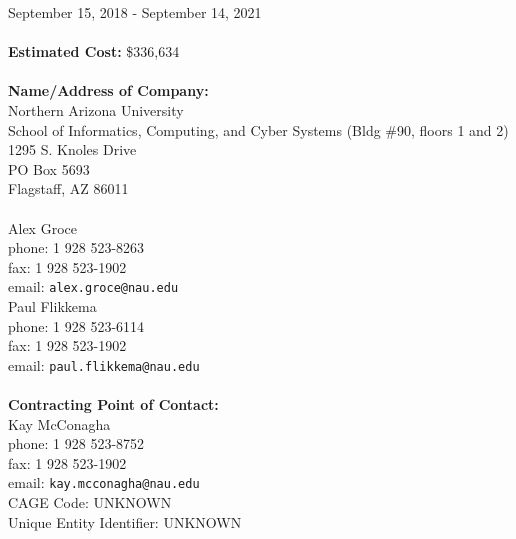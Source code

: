 \documentclass[12pt]{article}
\newcommand{\mycomment}[1]{}
\begin{document}
\mycomment{
\numberofauthors{1}
\author{
\alignauthor
Arpit Christi, Matthew Lyle Olson, Mohammad Amin Alipour, Alex Groce\\
\affaddr{School of Electrical Engineering and Computer Science}\\
\affaddr{Oregon State University}
\affaddr{Corvallis, OR USA}\\
}
}

\maketitle

 September 15, 2018 - September
14, 2021\\
\vspace{0.1in}\\
{\bf Estimated Cost:} \$336,634\\
\vspace{0.1in}\\
{\bf Name/Address of Company:}\\
Northern Arizona University\\
School of Informatics, Computing, and Cyber Systems (Bldg \#90, floors 1 and 2)\\
1295 S. Knoles Drive \\
PO Box 5693 \\
Flagstaff, AZ 86011\\
\newpage
{}\\
Alex Groce\\
phone: 1 928 523-8263\\
fax: 1 928 523-1902\\
email: {\tt alex.groce@nau.edu}\\
Paul Flikkema\\
phone: 1 928 523-6114\\
fax: 1 928 523-1902\\
email: {\tt paul.flikkema@nau.edu}\\
\vspace{0.05in}\\
{\bf Contracting Point of Contact:}\\
Kay McConagha\\
phone: 1 928 523-8752\\
fax: 1 928 523-1902\\
email: {\tt kay.mcconagha@nau.edu}
\vspace{1in}\\
CAGE Code: UNKNOWN\\
Unique Entity Identifier:  UNKNOWN\\
\end{document}
